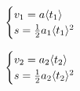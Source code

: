 \begin{equation} \begin{cases}v_{1}=a\langle t_{1}\rangle\\ s=\frac{1}{2}a_{1}\langle t_{1}\rangle^{2}\\ \end{cases}\ \\  \end{equation}

\begin{equation} \begin{cases}v_{2}=a_2\langle t_{2}\rangle\\ s=\frac{1}{2}a_{2}\langle t_{2}\rangle^{2}\\ \end{cases}\ \\  \end{equation}